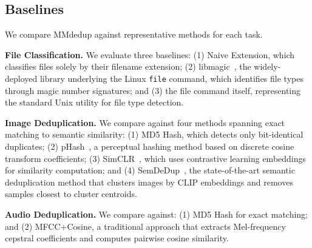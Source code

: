 \documentclass[conference]{IEEEtran}
\begin{document}

\subsection{Baselines}

We compare MMdedup against representative methods for each task.

\textbf{File Classification.} We evaluate three baselines: (1) Naive Extension, which classifies files solely by their filename extension; (2) libmagic~\cite{darwin2008libmagic}, the widely-deployed library underlying the Linux \texttt{file} command, which identifies file types through magic number signatures; and (3) the file command itself, representing the standard Unix utility for file type detection.

\textbf{Image Deduplication.} We compare against four methods spanning exact matching to semantic similarity: (1) MD5 Hash, which detects only bit-identical duplicates; (2) pHash~\cite{zauner2010implementation}, a perceptual hashing method based on discrete cosine transform coefficients; (3) SimCLR~\cite{chen2020simple}, which uses contrastive learning embeddings for similarity computation; and (4) SemDeDup~\cite{abbas2023semdedup}, the state-of-the-art semantic deduplication method that clusters images by CLIP embeddings and removes samples closest to cluster centroids.

\textbf{Audio Deduplication.} We compare against: (1) MD5 Hash for exact matching; and (2) MFCC+Cosine, a traditional approach that extracts Mel-frequency cepstral coefficients and computes pairwise cosine similarity.
\end{document}
